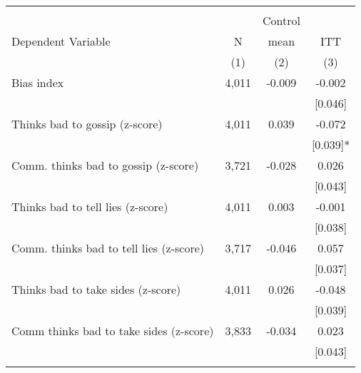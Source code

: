 \begin{tabular}{lccc}
\hline \noalign{\smallskip} &  &  & \\
 &  & Control & \\
Dependent Variable & N & mean & ITT\\
 & (1) & (2) & (3)\\
\noalign{\smallskip}\hline \noalign{\smallskip}\quad Bias index & 4,011 & -0.009 & -0.002\\
 &  &  & [0.046]\\
\quad Thinks bad to gossip (z-score) & 4,011 & 0.039 & -0.072\\
 &  &  & [0.039]*\\
\quad Comm. thinks bad to gossip (z-score) & 3,721 & -0.028 & 0.026\\
 &  &  & [0.043]\\
\quad Thinks bad to tell lies (z-score) & 4,011 & 0.003 & -0.001\\
 &  &  & [0.038]\\
\quad Comm. thinks bad to tell lies (z-score) & 3,717 & -0.046 & 0.057\\
 &  &  & [0.037]\\
\quad Thinks bad to take sides (z-score) & 4,011 & 0.026 & -0.048\\
 &  &  & [0.039]\\
\quad Comm thinks bad to take sides (z-score) & 3,833 & -0.034 & 0.023\\
 &  &  & [0.043]\\
\noalign{\smallskip}\hline\end{tabular}
